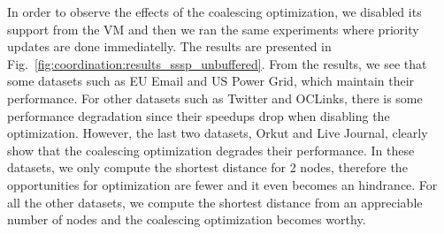 In order to observe the effects of the coalescing optimization, we disabled its
support from the VM and then we ran the same experiments where priority updates
are done immediatelly. The results are presented in
Fig.~\ref{fig:coordination:results_sssp_unbuffered}. From the results, we see
that some datasets such as EU Email and US Power Grid, which maintain their
performance. For other datasets such as Twitter and OCLinks, there is some
performance degradation since their speedups drop when disabling the
optimization. However, the last two datasets, Orkut and Live Journal, clearly
show that the coalescing optimization degrades their performance. In these
datasets, we only compute the shortest distance for 2 nodes, therefore the
opportunities for optimization are fewer and it even becomes an hindrance. For
all the other datasets, we compute the shortest distance from an appreciable
number of nodes and the coalescing optimization becomes worthy.




